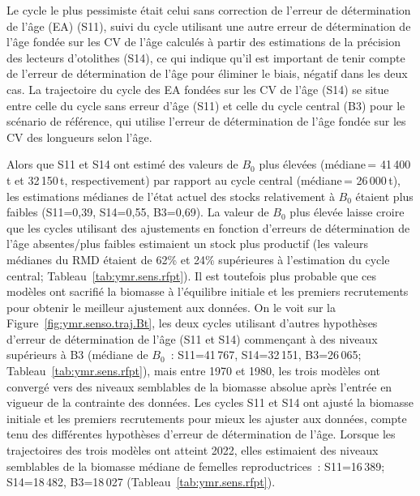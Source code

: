 \documentclass[11pt]{book}
\newcommand{\pc}{\%}
\begin{document}
Le cycle le plus pessimiste \'{e}tait celui sans correction de l'erreur de d\'{e}termination de l'\^{a}ge (EA) (S11), suivi du cycle utilisant une autre erreur de d\'{e}termination de l'\^{a}ge fond\'{e}e sur les CV de l'\^{a}ge calcul\'{e}s \`{a} partir des estimations de la pr\'{e}cision des lecteurs d'otolithes (S14), ce qui indique qu'il est important de tenir compte de l'erreur de d\'{e}termination de l'\^{a}ge pour \'{e}liminer le biais, n\'{e}gatif dans les deux cas.
La trajectoire du cycle des EA fond\'{e}es sur les CV de l'\^{a}ge (S14) se situe entre celle du cycle sans erreur d'\^{a}ge (S11) et celle du cycle central (B3) pour le sc\'{e}nario de r\'{e}f\'{e}rence, qui utilise l'erreur de d\'{e}termination de l'\^{a}ge fond\'{e}e sur les CV des longueurs selon l'\^{a}ge.

Alors que S11 et S14 ont estim\'{e} des valeurs de $B_0$ plus \'{e}lev\'{e}es (m\'{e}diane\,= 41\,400\,t et 32\,150\,t, respectivement) par rapport au cycle central (m\'{e}diane\,= 26\,000\,t), les estimations m\'{e}dianes de l'\'{e}tat actuel des stocks relativement \`{a} $B_0$ \'{e}taient plus faibles (S11=0,39, S14=0,55, B3=0,69).
La valeur de $B_0$ plus \'{e}lev\'{e}e laisse croire que les cycles utilisant des ajustements en fonction d'erreurs de d\'{e}termination de l'\^{a}ge absentes/plus faibles estimaient un stock plus productif (les valeurs m\'{e}dianes du RMD  \'{e}taient de 62\pc{} et 24\pc{} sup\'{e}rieures \`{a} l'estimation du cycle central; Tableau~\ref{tab:ymr.sens.rfpt}).
Il est toutefois plus probable que ces mod\`{e}les ont sacrifi\'{e} la biomasse \`{a} l'\'{e}quilibre initiale et les premiers recrutements pour obtenir le meilleur ajustement aux donn\'{e}es.
On le voit sur la Figure~\ref{fig:ymr.senso.traj.Bt}, les deux cycles utilisant d'autres hypoth\`{e}ses d'erreur de d\'{e}termination de l'\^{a}ge (S11 et S14) commen\c{c}ant \`{a} des niveaux sup\'{e}rieurs \`{a} B3 (m\'{e}diane de $B_0$~: S11=41\,767, S14=32\,151, B3=26\,065; Tableau~\ref{tab:ymr.sens.rfpt}), mais entre 1970 et 1980, les trois mod\`{e}les ont converg\'{e} vers des niveaux semblables de la biomasse absolue apr\`{e}s l'entr\'{e}e en vigueur de la contrainte des donn\'{e}es. Les cycles S11 et S14 ont ajust\'{e} la biomasse initiale et les premiers recrutements pour mieux les ajuster aux donn\'{e}es, compte tenu des diff\'{e}rentes hypoth\`{e}ses d'erreur de d\'{e}termination de l'\^{a}ge. Lorsque les trajectoires des trois mod\`{e}les ont atteint 2022, elles estimaient des niveaux semblables de la biomasse m\'{e}diane de femelles reproductrices~: S11=16\,389; S14=18\,482, B3=18\,027 (Tableau~\ref{tab:ymr.sens.rfpt}).
\end{document}
